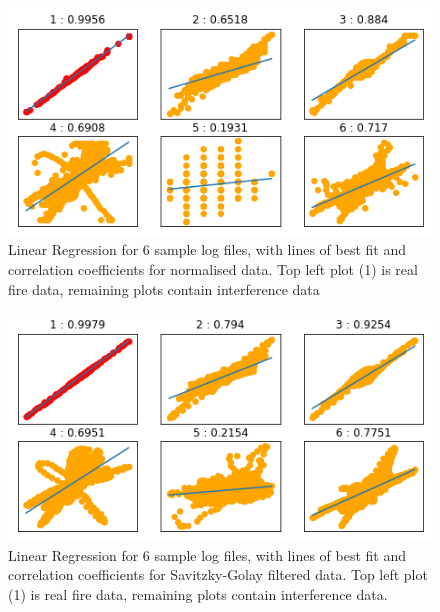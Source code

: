 \begin{figure}[tb]
 \centering %
 \includegraphics[width=\columnwidth]{pictures/01-raw-linear-regression.png}
 \caption{Linear Regression for 6 sample log files, with lines of best fit and correlation coefficients for normalised data. Top left plot (1) is real fire data, remaining plots contain interference data}
 \label{fig:sample}
\end{figure}

\begin{figure}[tb]
 \centering %
 \includegraphics[width=\columnwidth]{pictures/02-sg-linear-regression.png}
 \caption{Linear Regression for 6 sample log files, with lines of best fit and correlation coefficients for Savitzky-Golay filtered data. Top left plot (1) is real fire data, remaining plots contain interference data.}
 \label{fig:sample}
\end{figure}

